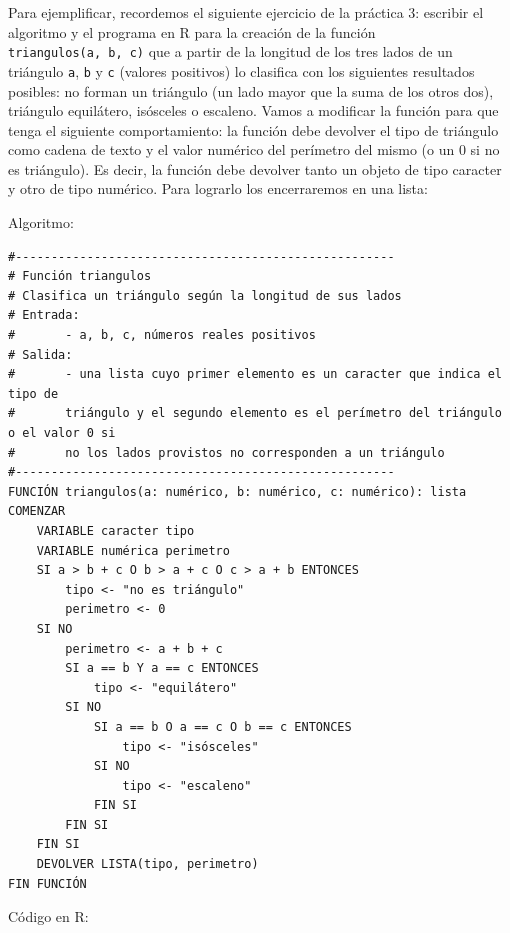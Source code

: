 \documentclass[
]{book}
\begin{document}
Para ejemplificar, recordemos el siguiente ejercicio de la práctica 3: escribir el algoritmo y el programa en R para la creación de la función \texttt{triangulos(a,\ b,\ c)} que a partir de la longitud de los tres lados de un triángulo \texttt{a}, \texttt{b} y \texttt{c} (valores positivos) lo clasifica con los siguientes resultados posibles: no forman un triángulo (un lado mayor que la suma de los otros dos), triángulo equilátero, isósceles o escaleno. Vamos a modificar la función para que tenga el siguiente comportamiento: la función debe devolver el tipo de triángulo como cadena de texto y el valor numérico del perímetro del mismo (o un 0 si no es triángulo). Es decir, la función debe devolver tanto un objeto de tipo caracter y otro de tipo numérico. Para lograrlo los encerraremos en una lista:

Algoritmo:

\begin{verbatim}
#-----------------------------------------------------
# Función triangulos
# Clasifica un triángulo según la longitud de sus lados
# Entrada:
#       - a, b, c, números reales positivos
# Salida:
#       - una lista cuyo primer elemento es un caracter que indica el tipo de
#       triángulo y el segundo elemento es el perímetro del triángulo o el valor 0 si
#       no los lados provistos no corresponden a un triángulo
#-----------------------------------------------------
FUNCIÓN triangulos(a: numérico, b: numérico, c: numérico): lista
COMENZAR
    VARIABLE caracter tipo
    VARIABLE numérica perimetro
    SI a > b + c O b > a + c O c > a + b ENTONCES
        tipo <- "no es triángulo"
        perimetro <- 0
    SI NO
        perimetro <- a + b + c
        SI a == b Y a == c ENTONCES
            tipo <- "equilátero"
        SI NO
            SI a == b O a == c O b == c ENTONCES
                tipo <- "isósceles"
            SI NO
                tipo <- "escaleno"
            FIN SI
        FIN SI
    FIN SI
    DEVOLVER LISTA(tipo, perimetro)
FIN FUNCIÓN
\end{verbatim}

Código en R:
\end{document}
